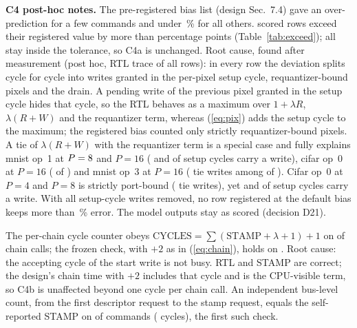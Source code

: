 \documentclass[conference]{IEEEtran}
\begin{document}
\textbf{C4 post-hoc notes.} The pre-registered bias list (design Sec.~7.4) gave an over-prediction for a few commands and under \BiasDefault\,\% for all others. \NExceed{} scored rows exceed their registered value by more than \ExceedMargin{} percentage points (Table~\ref{tab:exceed}); all stay inside the tolerance, so C4a is unchanged. Root cause, found after measurement (post hoc, RTL trace of all \TieNProbed{} rows): in every row the deviation splits cycle for cycle into writes granted in the per-pixel setup cycle, requantizer-bound pixels and the drain. A pending write of the previous pixel granted in the setup cycle hides that cycle, so the RTL behaves as a maximum over $1+\lambda R$, $\lambda(R+W)$ and the requantizer term, whereas (\ref{eq:pix}) adds the setup cycle to the maximum; the registered bias counted only strictly requantizer-bound pixels. A tie of $\lambda(R+W)$ with the requantizer term is a special case and fully explains mnist op~1 at $P=8$ and $P=16$ (\TieMnistWrites{} and \TieMnistSixteenWrites{} of \TieMnistPixels{} setup cycles carry a write), cifar op~0 at $P=16$ (\TieCifarWrites{} of \TieCifarPixels{}) and mnist op~3 at $P=16$ (\TieMnistThreeTie{} tie writes among \TieMnistThreeWrites{} of \TieMnistThreePixels{}). Cifar op~0 at $P=4$ and $P=8$ is strictly port-bound (\TieCifarFourTie{} tie writes), yet \TieCifarFourWrites{} and \TieCifarEightWrites{} of \TieCifarFourPixels{} setup cycles carry a write. With all setup-cycle writes removed, no row registered at the default bias keeps more than \TieResidMax\,\% error. The model outputs stay as scored (decision D21).

The per-chain cycle counter obeys $\mathrm{CYCLES}=\sum(\mathrm{STAMP}+\lambda+1)+1$ on \IdentPlusOne{} of \IdentCalls{} chain calls; the frozen check, with $+2$ as in (\ref{eq:chain}), holds on \IdentPlusTwo. Root cause: the accepting cycle of the start write is not busy. RTL and STAMP are correct; the design's chain time with $+2$ includes that cycle and is the CPU-visible term, so C4b is unaffected beyond one cycle per chain call. An independent bus-level count, from the first descriptor request to the stamp request, equals the self-reported STAMP on \IndepStampAgree{} of \IndepStampN{} commands (\IndepStampList{} cycles), the first such check.

\begin{table}[t]\centering\caption{Commands whose error exceeds the pre-registered bias (cycles; error and registered bias in \%).}\label{tab:exceed}
\footnotesize
\end{table}
\end{document}
